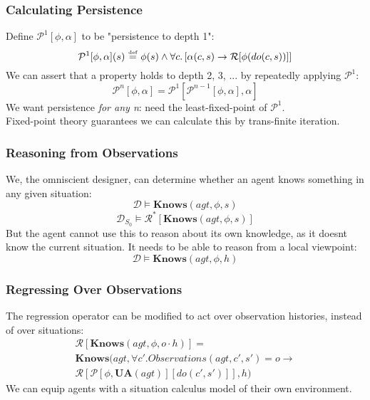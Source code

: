 \documentclass{beamer}
\newcommand{\isdef}{\hbox{$\stackrel{\mbox{\tiny def}}{=}$}}
\begin{document}
\begin{frame}
\frametitle{Calculating Persistence}
Define $\mathcal{P}^{1}[\phi,\alpha]$ to be "persistence to depth 1":
\begin{equation*}
  \mathcal{P}^{1}[\phi,\alpha](s)\ \isdef\ \phi(s) \wedge \forall c . \left[\alpha(c,s) \rightarrow \mathcal{R}[\phi(do(c,s))]\right]
\end{equation*}
We can assert that a property holds to depth 2, 3, ... by repeatedly applying
$\mathcal{P}^{1}$:
\begin{equation*}
  \mathcal{P}^{n}[\phi,\alpha] = \mathcal{P}^{1}[\mathcal{P}^{n-1}[\phi,\alpha],\alpha]
\end{equation*}
We want persistence \emph{for any n}:  need the least-fixed-point of $\mathcal{P}^{1}$. \\
Fixed-point theory guarantees we can calculate this by trans-finite iteration.
\end{frame}

\begin{frame}
\frametitle{Reasoning from Observations}
We, the omniscient designer, can determine whether an agent knows something
 in any given situation:
\begin{equation*}
  \mathcal{D} \models \mathbf{Knows}(agt,\phi,s)
\end{equation*}
\begin{equation*}
  \mathcal{D}_{S_0} \models \mathcal{R}^{*}[\mathbf{Knows}(agt,\phi,s)]
\end{equation*}
But the agent cannot use this to reason about its own knowledge, as it doesnt
know the current situation.  It needs to be able to reason from a local
viewpoint:
\begin{equation*}
  \mathcal{D} \models \mathbf{Knows}(agt,\phi,h)
\end{equation*}
\end{frame}

\begin{frame}
\frametitle{Regressing Over Observations}
The regression operator can be modified to act over observation histories,
instead of over situations:
\begin{multline*}
  \mathcal{R}[\mathbf{Knows}(agt,\phi,o \cdot h)] = \\
  \mathbf{Knows}(agt,\forall c' . Observations(agt,c',s')=o \rightarrow \\
     \mathcal{R}[\mathcal{P}[\phi,\mathbf{UA}(agt)][do(c',s')]],h)
\end{multline*}
We can equip agents with a situation calculus model of their own environment.
\end{frame}
\end{document}
